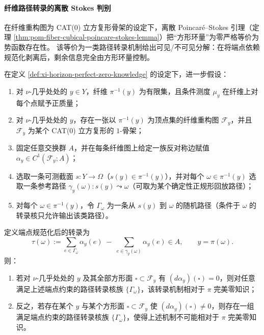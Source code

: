 \paragraph{纤维路径转录的离散 Stokes 判别}
在纤维重构图为 CAT(0) 立方复形骨架的设定下，离散 Poincar\'e--Stokes 引理（定理 \ref{thm:pom-fiber-cubical-poincare-stokes-lemma}）把“方形环量”为零严格等价为势函数存在性。
该等价为一类路径转录机制给出可见/不可见分解：在将端点依赖规范化剥离后，剩余信息完全由方形环量控制。

\begin{proposition}\label{prop:xi-horizon-zk-fiberpath-stokes-discriminant}
在定义 \ref{def:xi-horizon-perfect-zero-knowledge} 的设定下，进一步假设：
\begin{enumerate}
  \item 对 \(\nu\)-几乎处处的 \(y\in Y\)，纤维 \(\pi^{-1}(y)\) 为有限集，且条件测度 \(\mu_y\) 在纤维上对每个点赋予正质量；
  \item 对 \(\nu\)-几乎处处的 \(y\)，存在一张以 \(\pi^{-1}(y)\) 为顶点集的纤维重构图 \(\mathcal F_y\)，并且 \(\mathcal F_y\) 为某个 CAT(0) 立方复形的 \(1\)-骨架；
  \item 固定任意交换群 \(A\)，并在每条纤维图上给定一族反对称边赋值 \(\alpha_y\in C^1(\mathcal F_y;A)\)；
  \item 选取一条可测截面 \(s:Y\to\Omega\)（\(s(y)\in\pi^{-1}(y)\)），并对每个 \(\omega\in\pi^{-1}(y)\) 选取一条参考路径 \(\gamma_{y}(\omega):s(y)\leadsto \omega\)（可取为某个确定性正规形回放路径）；
  \item 对每个 \(\omega\in\pi^{-1}(y)\)，令 \(\Gamma_\omega\) 为一条从 \(s(y)\) 到 \(\omega\) 的随机路径（条件于 \(\omega\) 的转录核只允许输出该类路径）。
\end{enumerate}
定义端点规范化后的转录为
\[
\tau(\omega)
:=\sum_{e\in\Gamma_\omega}\alpha_y(e)\;-\;\sum_{e\in\gamma_y(\omega)}\alpha_y(e)\in A,
\qquad y=\pi(\omega).
\]
则：
\begin{enumerate}
  \item 若对 \(\nu\)-几乎处处的 \(y\) 及其全部方形面 \(\square\subset\mathcal F_y\) 有 \((d\alpha_y)(\square)=0\)，则对任意满足上述端点约束的路径转录核族 \(\{\Gamma_\omega\}\)，该转录机制相对于 \(\pi\) 完美零知识；
  \item 反之，若存在某个 \(y\) 与某个方形面 \(\square\subset\mathcal F_y\) 使 \((d\alpha_y)(\square)\neq 0\)，则存在一组满足端点约束的路径转录核族 \(\{\Gamma_\omega\}\)，使得上述机制不可能相对于 \(\pi\) 完美零知识。
\end{enumerate}
\end{proposition}
